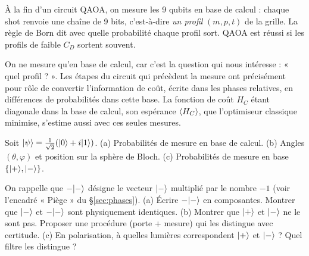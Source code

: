 \begin{projet}
À la fin d'un circuit QAOA, on mesure les 9 qubits en base de calcul : chaque shot renvoie une chaîne de 9 bits, c'est-à-dire \emph{un profil} $(m,p,t)$ de la grille. La règle de Born dit avec quelle probabilité chaque profil sort. QAOA est réussi si les profils de faible $C_D$ sortent souvent.

On ne mesure qu'en base de calcul, car c'est la question qui nous intéresse : « quel profil ? ». Les étapes du circuit qui précèdent la mesure ont précisément pour rôle de convertir l'information de coût, écrite dans les phases relatives, en différences de probabilités dans cette base. La fonction de coût $H_C$ étant diagonale dans la base de calcul, son espérance $\langle H_C\rangle$, que l'optimiseur classique minimise, s'estime aussi avec ces seules mesures.
\end{projet}

\exercices
\begin{exercice}
Soit $\lvert \psi\rangle=\tfrac{1}{\sqrt2}(\lvert 0\rangle+i\lvert 1\rangle)$. (a) Probabilités de mesure en base de calcul. (b) Angles $(\theta,\varphi)$ et position sur la sphère de Bloch. (c) Probabilités de mesure en base $\{\lvert +\rangle,\lvert -\rangle\}$.
\end{exercice}
\begin{exercice}
On rappelle que $-\lvert -\rangle$ désigne le vecteur $\lvert -\rangle$ multiplié par le nombre $-1$ (voir l'encadré « Piège » du §\ref{sec:phases}). (a) Écrire $-\lvert -\rangle$ en composantes. Montrer que $\lvert -\rangle$ et $-\lvert -\rangle$ sont physiquement identiques. (b) Montrer que $\lvert +\rangle$ et $\lvert -\rangle$ ne le sont pas. Proposer une procédure (porte + mesure) qui les distingue avec certitude. (c) En polarisation, à quelles lumières correspondent $\lvert +\rangle$ et $\lvert -\rangle$ ? Quel filtre les distingue ?
\end{exercice}
